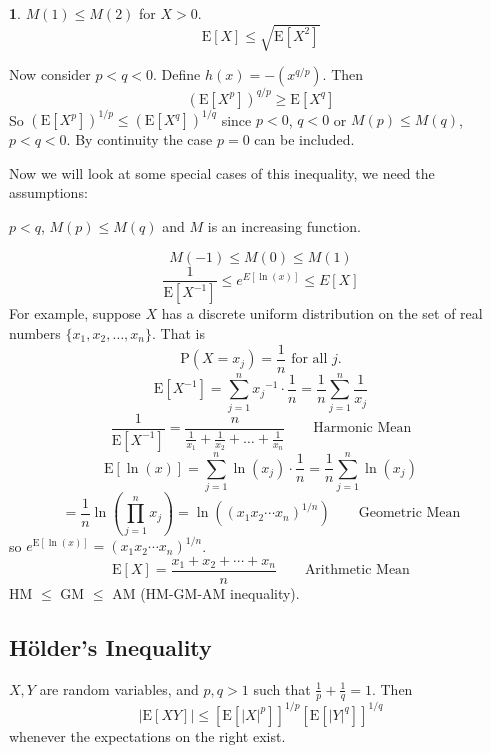 \documentclass[english,12pt]{article}
\theoremstyle{plain}
\theoremstyle{definition}
\newtheorem*{example}{\protect\examplename}
\theoremstyle{definition} %
\newcommand{\eg}[1]{\begin{example} #1 \end{example} }
\providecommand{\examplename}{Example}
\newcommand{\ex}[1]{\mbox{E} \left[ #1 \right]}
\begin{document}
\eg{
$M(1) \leq M(2)$ for $X>0$.
\[ \ex{X} \leq \sqrt{\ex{X^2}} \]
}

Now consider $p < q < 0$. Define $h(x) = -(x^{q/p})$. Then
\[ (\ex{X^p})^{q/p} \geq \ex{X^q} \]
So $(\ex{X^p})^{1/p} \leq (\ex{X^q})^{1/q}$ since $p < 0$, $q < 0$ or $M( p ) \leq M( q )$, $p < q < 0$.  By continuity the case $p=0$ can be included.

Now we will look at some special cases of this inequality, we need the assumptions:

$p < q$, $M(p) \leq M(q)$ and $M$ is an increasing function.

\[ M(-1) \leq M(0) \leq M(1) \]
\[ \frac{1}{\ex{X^{-1}}} \leq e^{E[ \ln(x) ]} \leq E[X] \]
For example, suppose $X$ has a discrete uniform distribution on the set of real numbers $\{ x_1, x_2, \ldots, x_n \}$. That is 
\[ \text{P}(X = x_j) = \frac{1}{n} \text{ for all } j. \]
\[ \ex{X^{-1}} = \sum_{j=1}^n {x_j}^{-1} \cdot \frac{1}{n} = \frac{1}{n} \sum_{j=1}^n \frac{1}{x_j} \]
\[ \frac{1}{\ex{X^{-1}}} = \frac{n}{\frac{1}{x_1} + \frac{1}{x_2} + \ldots + \frac{1}{x_n}} \qquad \text{Harmonic Mean} \]
\[ \ex{\ln(x)} = \sum_{j=1}^n \ln(x_j) \cdot \frac{1}{n} = \frac{1}{n} \sum_{j=1}^n \ln(x_j) \]
\[ = \frac{1}{n} \ln \left( \prod_{j=1}^n x_j \right) = \ln \left( (x_1 x_2 \cdots x_n)^{1/n} \right) \qquad \text{Geometric Mean} \]
so $e^{\text{E}[ \ln(x) ]} = (x_1 x_2 \cdots  x_n)^{1/n}$.
\[ \ex{X} = \frac{x_1 + x_2 + \cdots + x_n}{n} \qquad \text{Arithmetic Mean} \]
HM $\leq$ GM $\leq$ AM (HM-GM-AM inequality).

\subsection{H\"{o}lder's Inequality}

$X, Y$ are random variables, and $p, q > 1$ such that $\frac{1}{p} + \frac{1}{q} = 1$. Then
\[ |\ex{XY}| \leq [\ex{|X|^p}]^{1/p} [\ex{|Y|^q}]^{1/q} \]
whenever the expectations on the right exist.
\end{document}
